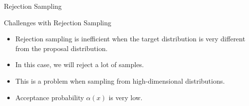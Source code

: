 \documentclass{beamer}
\begin{document}
\begin{section}{Rejection Sampling}


    \begin{frame}{Challenges with Rejection Sampling}
        \begin{itemize}
            \item Rejection sampling is inefficient when the target distribution is very different from the proposal distribution.
            \item In this case, we will reject a lot of samples.
            \item This is a problem when sampling from high-dimensional distributions.
            \item Acceptance probability $\alpha(x)$ is very low.
        \end{itemize}
    \end{frame}

\end{section}
\end{document}
